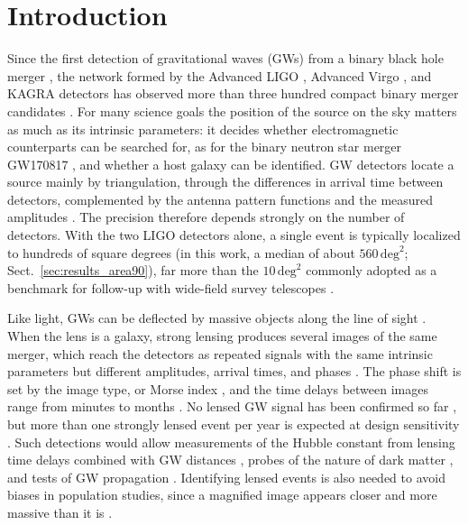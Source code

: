 \documentclass{aa}
\begin{document}
\section{Introduction}
\label{sec:intro}

Since the first detection of gravitational waves (GWs) from a binary black
hole merger \citep{GW150914}, the network formed by the Advanced LIGO
\citep{Advanced_ligo}, Advanced Virgo \citep{Advanced_VIRGO}, and KAGRA
\citep{KAGRA} detectors has observed more than three hundred compact binary
merger candidates \citep{GWTC4_introduction,GWTC5}. For many science goals
the position of the source on the sky matters as much as its intrinsic
parameters: it decides whether electromagnetic counterparts can be searched
for, as for the binary neutron star merger GW170817 \citep{GW170817}, and
whether a host galaxy can be identified. GW detectors locate a source mainly
by triangulation, through the differences in arrival time between detectors,
complemented by the antenna pattern functions and the measured amplitudes
\citep{triangulation_GW}. The precision therefore depends strongly on the
number of detectors. With the two LIGO detectors alone, a single event is
typically localized to hundreds of square degrees (in this work, a median
of about $560\,\mathrm{deg}^2$; Sect.~\ref{sec:results_area90}), far more
than the $10\,\mathrm{deg}^2$ commonly adopted as a benchmark for follow-up
with wide-field survey telescopes \citep{Abbott2020Prospects}.

Like light, GWs can be deflected by massive objects along the line of
sight \citep{GW_lensing_original}. When the lens is a galaxy, strong lensing
produces several images of the same merger, which reach the detectors as
repeated signals with the same intrinsic parameters but different
amplitudes, arrival times, and phases \citep{Lensing_phase_effects}. The
phase shift is set by the image type, or Morse index \citep{morse_index},
and the time delays between images range from minutes to months
\citep{time_delay}. No lensed GW signal has been confirmed so far
\citep{theligoscientificcollaboration2026gwtc40searchesgravitationalwavelensing},
but more than one strongly lensed event per year is expected at design
sensitivity \citep{time_delay}. Such detections would allow measurements of
the Hubble constant from lensing time delays combined with GW distances
\citep{Schutz1986,hubble_constant_lensing}, probes of the nature of dark
matter \citep{jana2024probingnaturedarkmatter}, and tests of GW propagation
\citep{test_GR_lensing}. Identifying lensed events is also needed to avoid
biases in population studies, since a magnified image appears closer and
more massive than it is \citep{population_lensing}.
\end{document}

